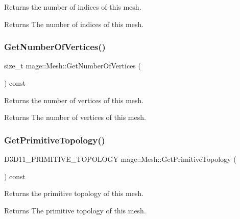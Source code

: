 Returns the number of indices of this mesh.

\begin{DoxyReturn}{Returns}
The number of indices of this mesh. 
\end{DoxyReturn}
\hypertarget{classmage_1_1_mesh_a47732f4ac48000c2a1f5562bdba38a81}{}\label{classmage_1_1_mesh_a47732f4ac48000c2a1f5562bdba38a81} 
\subsubsection{\texorpdfstring{Get\+Number\+Of\+Vertices()}{GetNumberOfVertices()}}
{\footnotesize\ttfamily size\+\_\+t mage\+::\+Mesh\+::\+Get\+Number\+Of\+Vertices (\begin{DoxyParamCaption}{ }\end{DoxyParamCaption}) const}

Returns the number of vertices of this mesh.

\begin{DoxyReturn}{Returns}
The number of vertices of this mesh. 
\end{DoxyReturn}
\hypertarget{classmage_1_1_mesh_a3628c67de9562e31a8266a51776c903a}{}\label{classmage_1_1_mesh_a3628c67de9562e31a8266a51776c903a} 
\subsubsection{\texorpdfstring{Get\+Primitive\+Topology()}{GetPrimitiveTopology()}}
{\footnotesize\ttfamily D3\+D11\+\_\+\+P\+R\+I\+M\+I\+T\+I\+V\+E\+\_\+\+T\+O\+P\+O\+L\+O\+GY mage\+::\+Mesh\+::\+Get\+Primitive\+Topology (\begin{DoxyParamCaption}{ }\end{DoxyParamCaption}) const}

Returns the primitive topology of this mesh.

\begin{DoxyReturn}{Returns}
The primitive topology of this mesh. 
\end{DoxyReturn}
\hypertarget{classmage_1_1_mesh_a2421eac892ef5fd6db21d8214c02e774}{}\label{classmage_1_1_mesh_a2421eac892ef5fd6db21d8214c02e774} 
